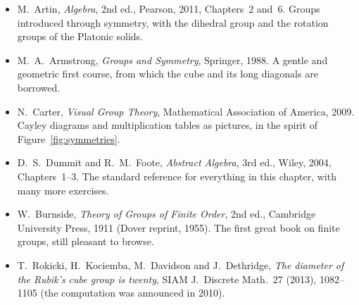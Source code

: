 \begin{itemize}
\item M.~Artin, \emph{Algebra}, 2nd ed., Pearson, 2011, Chapters~2 and~6. Groups introduced through symmetry, with the dihedral group and the rotation groups of the Platonic solids.
\item M.~A.~Armstrong, \emph{Groups and Symmetry}, Springer, 1988. A gentle and geometric first course, from which the cube and its long diagonals are borrowed.
\item N.~Carter, \emph{Visual Group Theory}, Mathematical Association of America, 2009. Cayley diagrams and multiplication tables as pictures, in the spirit of Figure~\ref{fig:symmetries}.
\item D.~S.~Dummit and R.~M.~Foote, \emph{Abstract Algebra}, 3rd ed., Wiley, 2004, Chapters~1--3. The standard reference for everything in this chapter, with many more exercises.
\item W.~Burnside, \emph{Theory of Groups of Finite Order}, 2nd ed., Cambridge University Press, 1911 (Dover reprint, 1955). The first great book on finite groups, still pleasant to browse.
\item T.~Rokicki, H.~Kociemba, M.~Davidson and J.~Dethridge, \emph{The diameter of the Rubik's cube group is twenty}, SIAM J.\ Discrete Math.\ 27 (2013), 1082--1105 (the computation was announced in 2010).
\end{itemize}
